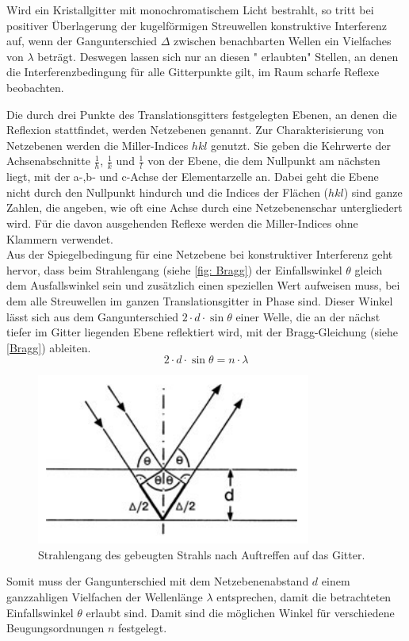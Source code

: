 \documentclass[a4paper,12pt,bibliography=totocnumbered]{scrartcl}
\begin{document}
Wird ein Kristallgitter mit monochromatischem Licht bestrahlt, so tritt bei positiver Überlagerung der kugelförmigen Streuwellen konstruktive Interferenz auf, wenn der Gangunterschied $\Delta$ zwischen benachbarten Wellen ein Vielfaches von $\lambda$ beträgt. \cite{Kristallgitter}
Deswegen lassen sich nur an diesen " erlaubten" Stellen, an denen die Interferenzbedingung für alle Gitterpunkte gilt, im Raum scharfe Reflexe beobachten.

Die durch drei Punkte des Translationsgitters festgelegten Ebenen, an denen die Reflexion stattfindet, werden Netzebenen genannt. Zur Charakterisierung von Netzebenen werden die Miller-Indices $hkl$ genutzt. Sie geben die Kehrwerte der Achsenabschnitte $\frac{1}{h}$, $\frac{1}{k}$ und $\frac{1}{l}$ von der Ebene, die dem Nullpunkt am nächsten liegt, mit der a-,b- und c-Achse der Elementarzelle an. Dabei geht die Ebene nicht durch den Nullpunkt hindurch und die Indices der Flächen ($hkl$) sind ganze Zahlen, die angeben, wie oft eine Achse durch eine Netzebenenschar untergliedert wird. Für die davon ausgehenden Reflexe werden die Miller-Indices ohne Klammern verwendet. \\
Aus der Spiegelbedingung für eine Netzebene bei konstruktiver Interferenz geht hervor, dass beim Strahlengang (siehe \autoref{fig: Bragg}) der Einfallswinkel $\theta$ gleich dem Ausfallswinkel sein und zusätzlich einen speziellen Wert aufweisen muss, bei dem alle Streuwellen im ganzen Translationsgitter in Phase sind. Dieser Winkel lässt sich aus dem Gangunterschied $2 \cdot d \cdot \sin \theta$ einer Welle, die an der nächst tiefer im Gitter liegenden Ebene reflektiert wird, mit der Bragg-Gleichung (siehe \autoref{Bragg}) ableiten. 
\begin{equation}
    2 \cdot d \cdot \sin \theta = n \cdot \lambda
    \label{Bragg}
\end{equation}

\begin{figure}[H]
    \centering
    \includegraphics[scale=0.95]{Bilder/Bragg.png}
    \caption{Strahlengang des gebeugten Strahls nach Auftreffen auf das Gitter. \cite{Kristallgitter}}
    \label{fig: Bragg}
\end{figure}
Somit muss der Gangunterschied mit dem Netzebenenabstand $d$ einem  ganzzahligen Vielfachen der Wellenlänge $\lambda$ entsprechen, damit die betrachteten Einfallswinkel $\theta$ erlaubt sind.
Damit sind die möglichen Winkel für verschiedene Beugungsordnungen $n$ festgelegt.
\end{document}
